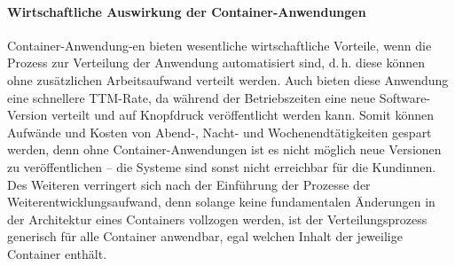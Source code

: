 \paragraph{Wirtschaftliche Auswirkung der Container-Anwendungen}\label{sec:auswirkungCA} 
Container-Anwendung-en bieten wesentliche wirtschaftliche Vorteile, wenn die Prozess zur Verteilung der Anwendung automatisiert sind, d.\,h. diese können ohne zusätzlichen Arbeitsaufwand verteilt werden. Auch bieten diese Anwendung eine schnellere \acl{TTM}-Rate, da während der Betriebszeiten eine neue Software-Version verteilt und auf Knopfdruck veröffentlicht werden kann. Somit können Aufwände und Kosten von Abend-, Nacht- und Wochenendtätigkeiten gespart werden, denn ohne Container-Anwendungen ist es nicht möglich neue Versionen zu veröffentlichen -- die Systeme sind sonst nicht erreichbar für die Kundinnen. Des Weiteren verringert sich nach der Einführung der Prozesse der Weiterentwicklungsaufwand, denn solange keine fundamentalen Änderungen in der Architektur eines Containers vollzogen werden, ist der Verteilungsprozess generisch für alle Container anwendbar, egal welchen Inhalt der jeweilige Container enthält. 